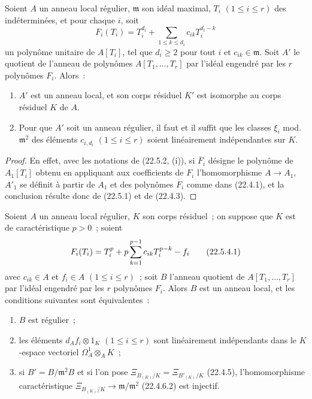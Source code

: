 \begin{corollary}[22.5.3]
\label{0.22.5.3-fr}
Soient $A$ un anneau local régulier, $\mathfrak m$ son idéal maximal,
$T_i$ $(1\leqslant i\leqslant r)$ des indéterminées, et pour chaque $i$, soit
\begin{equation}
\label{0.22.5.3.1-fr}
  F_i(T_i)=T_i^{d_i}+\sum_{1\leqslant k\leqslant d_i}c_{ik}T_i^{d_i-k}
  \tag{22.5.3.1}
\end{equation}
un polynôme unitaire de $A[T_i]$, tel que $d_i\geqslant2$ pour tout $i$ et
$c_{ik}\in\mathfrak m$. Soit $A'$ le quotient de l'anneau de polynômes
$A[T_1,\ldots,T_r]$ par l'idéal engendré par les $r$ polynômes $F_i$. Alors~:
\begin{enumerate}
  \item[\rm(i)] $A'$ est un anneau local, et son corps résiduel $K'$ est
  isomorphe au corps résiduel $K$ de $A$.
  \item[\rm(ii)] Pour que $A'$ soit un anneau régulier, il faut et il suffit
  que les classes $\xi_i$ \textup{mod.}~$\mathfrak m^2$ des éléments $c_{i,d_i}$
  $(1\leqslant i\leqslant r)$ soient linéairement indépendantes sur $K$.
\end{enumerate}
\end{corollary}

\begin{proof}
En effet, avec les notations de (22.5.2, (i)), si $\overline F_i$ désigne le
polynôme de $A_1[T_i]$ obtenu en appliquant aux coefficients de $F_i$
l'homomorphisme $A\longrightarrow A_1$, $A'_1$ se définit à partir de $A_1$ et
des polynômes $\overline F_i$ comme dans (22.4.1), et la conclusion résulte
donc de (22.5.1) et de (22.4.3).
\end{proof}

\begin{theorem}[22.5.4]
\label{0.22.5.4-fr}
Soient $A$ un anneau local régulier, $K$ son corps résiduel~; on suppose que
$K$ est de caractéristique $p>0$~; soient
\begin{equation}
\label{0.22.5.4.1-fr}
  F_i(T_i)=T_i^p+p\sum_{k=1}^{p-1}c_{ik}T_i^{p-k}- f_i
  \tag{22.5.4.1}
\end{equation}
avec $c_{ik}\in A$ et $f_i\in A$ $(1\leqslant i\leqslant r)$~; soit $B$
l'anneau quotient de $A[T_1,\ldots,T_r]$ par l'idéal engendré par les $r$
polynômes $F_i$. Alors $B$ est un anneau local, et les conditions suivantes
sont équivalentes~:
\begin{enumerate}
  \item[\textup{a)}] $B$ est régulier~;
  \item[\textup{b)}] les éléments $d_Af_i\otimes1_K$ $(1\leqslant i\leqslant r)$ sont
  linéairement indépendants dans le $K$-espace vectoriel
  $\Omega^1_A\otimes_AK$~;
  \item[\textup{c)}] si $B'=B/\mathfrak m^2B$ et si l'on pose
  $\Xi_{B_{(K)}/K}=\Xi_{B'_{(K)}/K}$ \textup{(22.4.5)}, l'homomorphisme
  caractéristique $\Xi_{B_{(K)}/K}\longrightarrow\mathfrak m/\mathfrak m^2$
  \textup{(22.4.6.2)} est injectif.
\end{enumerate}
\end{theorem}

